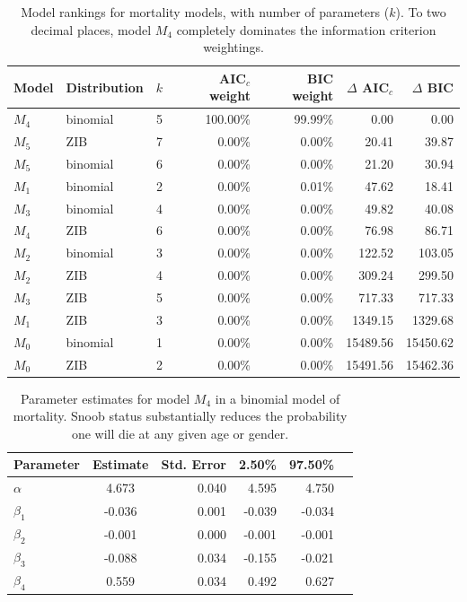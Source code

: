 \begin{table}[htbp]
  \centering
  
    \begin{tabular}{llrrrrr}
    \hline
    \hline
    Model & Distribution & $k$     & AIC$_c$ weight & BIC weight & $\Delta$ AIC$_c$ & $\Delta$ BIC \\
    \hline
    $M_4$    & binomial & 5     & 100.00\% & 99.99\% & 0.00  & 0.00 \\
    $M_5$   & ZIB   & 7     & 0.00\% & 0.00\% & 20.41 & 39.87 \\
    $M_5$    & binomial & 6     & 0.00\% & 0.00\% & 21.20 & 30.94 \\
    $M_1$    & binomial & 2     & 0.00\% & 0.01\% & 47.62 & 18.41 \\
    $M_3$    & binomial & 4     & 0.00\% & 0.00\% & 49.82 & 40.08 \\
    $M_4$   & ZIB   & 6     & 0.00\% & 0.00\% & 76.98 & 86.71 \\
    $M_2$    & binomial & 3     & 0.00\% & 0.00\% & 122.52 & 103.05 \\
    $M_2$   & ZIB   & 4     & 0.00\% & 0.00\% & 309.24 & 299.50 \\
    $M_3$   & ZIB   & 5     & 0.00\% & 0.00\% & 717.33 & 717.33 \\
    $M_1$   & ZIB   & 3     & 0.00\% & 0.00\% & 1349.15 & 1329.68 \\
    $M_0$    & binomial & 1     & 0.00\% & 0.00\% & 15489.56 & 15450.62 \\
    $M_0$   & ZIB   & 2     & 0.00\% & 0.00\% & 15491.56 & 15462.36 \\
    \hline
    \end{tabular}%
    \caption{Model rankings for mortality models, with number of parameters ($k$).  To two decimal places, model $M_4$ completely dominates the information criterion weightings.}
  \label{tab:morttab}%
\end{table}%


\begin{table}[htbp]
  \centering
    \begin{tabular}{lcrrrr}
    \hline
    \hline
    Parameter & Estimate & Std. Error & 2.50\% & 97.50\% \\
    \hline
    $\alpha$    & 4.673 & 0.040 & 4.595 & 4.750 \\
    $\beta_1$    & -0.036 & 0.001 & -0.039 & -0.034 \\
    $\beta_2$    & -0.001 & 0.000 & -0.001 & -0.001 \\
    $\beta_3$    & -0.088 & 0.034 & -0.155 & -0.021 \\
    $\beta_4$    & 0.559 & 0.034 & 0.492 & 0.627 \\
    \hline
    \end{tabular}%
    \caption{Parameter estimates for model $M_{4}$ in a binomial model of mortality.  Snoob status substantially reduces the probability one will die at any given age or gender.} 
  \label{tab:m4ests}%
\end{table}%




